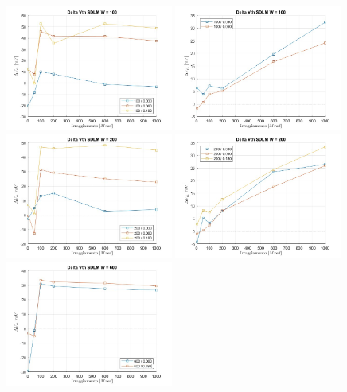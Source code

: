 \documentclass[
	a4paper,
	cleardoublepage=empty,
	headings=twolinechapter,
	numbers=autoenddot,
]{scrbook}
\begin{document}
\begin{figure}[H]
  \centering
  \includegraphics[width=0.49\textwidth]{sovrapposizione-deltaVth-SDLM-N100}
  \includegraphics[width=0.49\textwidth]{sovrapposizione-deltaVth-SDLM-P100}
  \includegraphics[width=0.49\textwidth]{sovrapposizione-deltaVth-SDLM-N200}
  \includegraphics[width=0.49\textwidth]{sovrapposizione-deltaVth-SDLM-P200}
  \includegraphics[width=0.49\textwidth]{sovrapposizione-deltaVth-SDLM-N600}

\end{figure}
\end{document}
